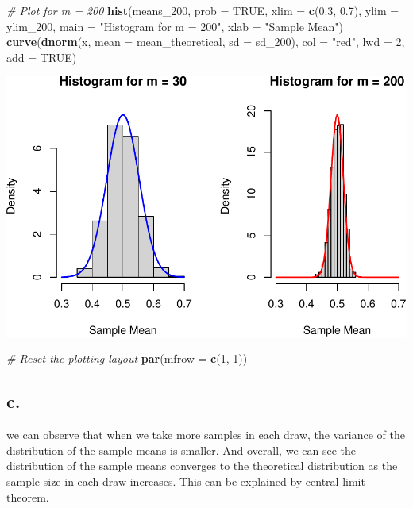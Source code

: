 \documentclass[
]{article}
\newenvironment{Shaded}{\begin{snugshade}}{\end{snugshade}}
\newcommand{\AttributeTok}[1]{\textcolor[rgb]{0.13,0.29,0.53}{#1}}
\newcommand{\CommentTok}[1]{\textcolor[rgb]{0.56,0.35,0.01}{\textit{#1}}}
\newcommand{\ConstantTok}[1]{\textcolor[rgb]{0.56,0.35,0.01}{#1}}
\newcommand{\DecValTok}[1]{\textcolor[rgb]{0.00,0.00,0.81}{#1}}
\newcommand{\FloatTok}[1]{\textcolor[rgb]{0.00,0.00,0.81}{#1}}
\newcommand{\FunctionTok}[1]{\textcolor[rgb]{0.13,0.29,0.53}{\textbf{#1}}}
\newcommand{\NormalTok}[1]{#1}
\newcommand{\StringTok}[1]{\textcolor[rgb]{0.31,0.60,0.02}{#1}}
\begin{document}
\begin{Shaded}
\begin{Highlighting}[]
\CommentTok{\# Plot for m = 200}
\FunctionTok{hist}\NormalTok{(means\_200, }\AttributeTok{prob =} \ConstantTok{TRUE}\NormalTok{, }\AttributeTok{xlim =} \FunctionTok{c}\NormalTok{(}\FloatTok{0.3}\NormalTok{, }\FloatTok{0.7}\NormalTok{), }\AttributeTok{ylim =}\NormalTok{ ylim\_200,}
     \AttributeTok{main =} \StringTok{"Histogram for m = 200"}\NormalTok{, }\AttributeTok{xlab =} \StringTok{"Sample Mean"}\NormalTok{)}
\FunctionTok{curve}\NormalTok{(}\FunctionTok{dnorm}\NormalTok{(x, }\AttributeTok{mean =}\NormalTok{ mean\_theoretical, }\AttributeTok{sd =}\NormalTok{ sd\_200), }\AttributeTok{col =} \StringTok{"red"}\NormalTok{, }\AttributeTok{lwd =} \DecValTok{2}\NormalTok{, }\AttributeTok{add =} \ConstantTok{TRUE}\NormalTok{)}
\end{Highlighting}
\end{Shaded}

\includegraphics{SDA_submission_template_files/figure-latex/unnamed-chunk-2-1.pdf}

\begin{Shaded}
\begin{Highlighting}[]
\CommentTok{\# Reset the plotting layout}
\FunctionTok{par}\NormalTok{(}\AttributeTok{mfrow =} \FunctionTok{c}\NormalTok{(}\DecValTok{1}\NormalTok{, }\DecValTok{1}\NormalTok{))}
\end{Highlighting}
\end{Shaded}

\subsection{c.}\label{c.}

we can observe that when we take more samples in each draw, the variance
of the distribution of the sample means is smaller. And overall, we can
see the distribution of the sample means converges to the theoretical
distribution as the sample size in each draw increases. This can be
explained by central limit theorem.
\end{document}
